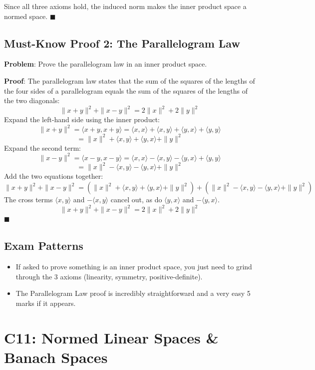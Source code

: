 \documentclass[
]{article}
\providecommand{\tightlist}{%
  \setlength{\itemsep}{0pt}\setlength{\parskip}{0pt}}
\begin{document}
Since all three axioms hold, the induced norm makes the inner product
space a normed space. \(\blacksquare\)

\subsection{Must-Know Proof 2: The Parallelogram
Law}\label{must-know-proof-2-the-parallelogram-law}

\textbf{Problem}: Prove the parallelogram law in an inner product space.

\textbf{Proof}: The parallelogram law states that the sum of the squares
of the lengths of the four sides of a parallelogram equals the sum of
the squares of the lengths of the two diagonals:
\[
\|x + y\|^2 + \|x - y\|^2 = 2\|x\|^2 + 2\|y\|^2
\]
Expand the left-hand side using the inner product:
\[
\|x + y\|^2 = \langle x + y, x + y \rangle = \langle x, x \rangle + \langle x, y \rangle + \langle y, x \rangle + \langle y, y \rangle
\]
\[
= \|x\|^2 + \langle x, y \rangle + \langle y, x \rangle + \|y\|^2
\]
Expand the second term:
\[
\|x - y\|^2 = \langle x - y, x - y \rangle = \langle x, x \rangle - \langle x, y \rangle - \langle y, x \rangle + \langle y, y \rangle
\]
\[
= \|x\|^2 - \langle x, y \rangle - \langle y, x \rangle + \|y\|^2
\]
Add the two equations together:
\[
\|x + y\|^2 + \|x - y\|^2 = (\|x\|^2 + \langle x, y \rangle + \langle y, x \rangle + \|y\|^2) + (\|x\|^2 - \langle x, y \rangle - \langle y, x \rangle + \|y\|^2)
\]
The cross terms \(\langle x, y \rangle\) and \(-\langle x, y \rangle\)
cancel out, as do \(\langle y, x \rangle\) and
\(-\langle y, x \rangle\).
\[
\|x + y\|^2 + \|x - y\|^2 = 2\|x\|^2 + 2\|y\|^2
\]
\(\blacksquare\)

\subsection{Exam Patterns}\label{exam-patterns-38}

\begin{itemize}
\tightlist
\item
  If asked to prove something is an inner product space, you just need
  to grind through the 3 axioms (linearity, symmetry,
  positive-definite).
\item
  The Parallelogram Law proof is incredibly straightforward and a very
  easy 5 marks if it appears.
\end{itemize}

\section{C11: Normed Linear Spaces \& Banach
Spaces}\label{c11-normed-linear-spaces-banach-spaces}
\end{document}
